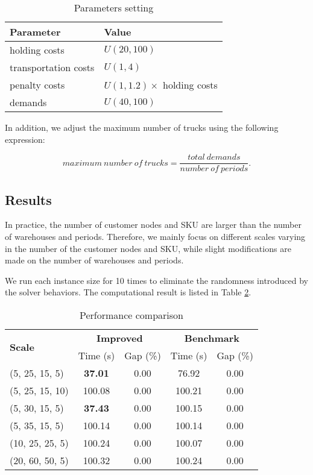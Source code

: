 \documentclass[a4paper,12pt]{article}
\begin{document}
\begin{table}[htbp]
    \centering
    \caption{Parameters setting}
    \label{tab:example}
    \begin{tabular}{ll}
        \toprule
        Parameter & Value \\
        \midrule
        holding costs   & $U(20, 100)$  \\
        transportation costs   & $U(1, 4)$  \\
        penalty costs   & $U(1, 1.2) \times$ holding costs  \\
        demands         & $U(40, 100)$ \\
        \bottomrule
    \end{tabular}
\end{table}

In addition, we adjust the maximum number of trucks using the following expression:

$$
maximum \ number \ of \ trucks = \frac{total \ demands}{number \ of \  periods}.
$$

\subsection{Results}

In practice, the number of customer nodes and SKU are larger than the number of warehouses and periods. Therefore, we mainly focus on different scales varying in the number of the customer nodes and SKU, while slight modifications are made on the number of warehouses and periods.

We run each instance size for 10 times to eliminate the randomness introduced by the solver behaviors. The computational result is listed in Table \ref{tab:method-comparison}.

\begin{table}[htbp]
    \centering
    \caption{Performance comparison}
    \label{tab:method-comparison}
    \begin{tabular}{lcc|cc}
        \toprule
        \multirow{2}{*}{\textbf{Scale}} & \multicolumn{2}{c|}{\textbf{Improved}} & \multicolumn{2}{c}{\textbf{Benchmark}} \\
        & Time (s) & Gap (\%) & Time (s) & Gap (\%) \\
        \midrule
        (5, 25, 15, 5)   & \textbf{37.01} & 0.00 & 76.92  & 0.00  \\
        (5, 25, 15, 10)   & 100.08 & 0.00 & 100.21  & 0.00  \\
        (5, 30, 15, 5)   & \textbf{37.43}  & 0.00 & 100.15  & 0.00  \\
        (5, 35, 15, 5)  & 100.14  & 0.00 & 100.14  & 0.00 \\
        (10, 25, 25, 5) & 100.24 & 0.00 & 100.07 & 0.00 \\
        (20, 60, 50, 5) & 100.32 & 0.00 & 100.24 & 0.00 \\
        \bottomrule
    \end{tabular}
\end{table}
\end{document}
